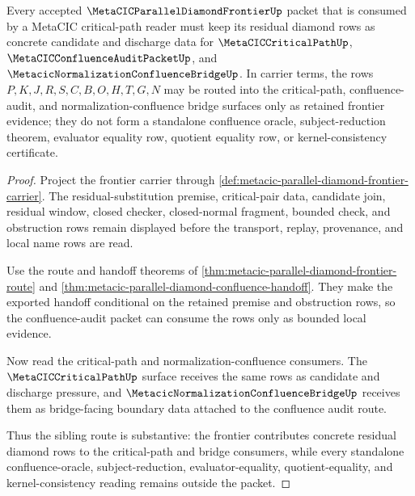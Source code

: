 \begin{theorem}
\label{thm:metacic-critical-path-bridge-frontier}
Every accepted $\MetaCICParallelDiamondFrontierUp$ packet that is consumed by a MetaCIC critical-path reader must keep its residual diamond rows as concrete candidate and discharge data for $\MetaCICCriticalPathUp$, $\MetaCICConfluenceAuditPacketUp$, and $\MetacicNormalizationConfluenceBridgeUp$. In carrier terms, the rows $P,K,J,R,S,C,B,O,H,T,G,N$ may be routed into the critical-path, confluence-audit, and normalization-confluence bridge surfaces only as retained frontier evidence; they do not form a standalone confluence oracle, subject-reduction theorem, evaluator equality row, quotient equality row, or kernel-consistency certificate.
\end{theorem}
\begin{proof}
Project the frontier carrier through \autoref{def:metacic-parallel-diamond-frontier-carrier}. The residual-substitution premise, critical-pair data, candidate join, residual window, closed checker, closed-normal fragment, bounded check, and obstruction rows remain displayed before the transport, replay, provenance, and local name rows are read.

Use the route and handoff theorems of \autoref{thm:metacic-parallel-diamond-frontier-route} and \autoref{thm:metacic-parallel-diamond-confluence-handoff}. They make the exported handoff conditional on the retained premise and obstruction rows, so the confluence-audit packet can consume the rows only as bounded local evidence.

Now read the critical-path and normalization-confluence consumers. The $\MetaCICCriticalPathUp$ surface receives the same rows as candidate and discharge pressure, and $\MetacicNormalizationConfluenceBridgeUp$ receives them as bridge-facing boundary data attached to the confluence audit route.

Thus the sibling route is substantive: the frontier contributes concrete residual diamond rows to the critical-path and bridge consumers, while every standalone confluence-oracle, subject-reduction, evaluator-equality, quotient-equality, and kernel-consistency reading remains outside the packet.
\end{proof}

